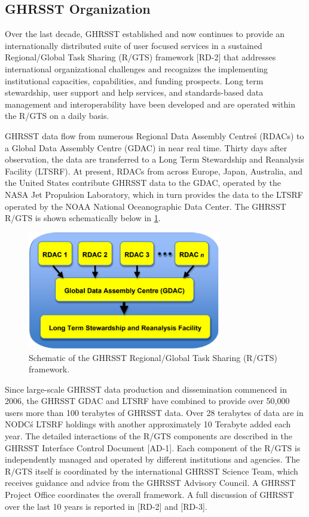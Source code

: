 \subsection{GHRSST Organization}
Over the last decade, GHRSST established and now continues to provide an internationally distributed suite of user focused services in a sustained Regional/Global Task Sharing (R/GTS) framework [RD-2] that addresses international organizational challenges and recognizes the implementing institutional capacities, capabilities, and funding prospects. Long term stewardship, user support and help services, and standards-based data management and interoperability have been developed and are operated within the R/GTS on a daily basis.
\par\vspace{0.25cm}
GHRSST data flow from numerous Regional Data Assembly Centre\'s (RDACs) to a Global Data Assembly Centre (GDAC) in near real time. Thirty days after observation, the data are transferred to a Long Term Stewardship and Reanalysis Facility (LTSRF). At present, RDACs from across Europe, Japan, Australia, and the United States contribute GHRSST data to the GDAC, operated by the NASA Jet Propulsion Laboratory, which in turn provides the data to the LTSRF operated by the NOAA National Oceanographic Data Center. The GHRSST R/GTS is shown schematically below in \ref{fig:r/gts}.
\begin{figure}[h]
    \centering
    \includegraphics[width=0.75\textwidth]{../images/schematicTaskSharing.drawio.png}
    \caption{Schematic of the GHRSST Regional/Global Task Sharing (R/GTS) framework.}
    \label{fig:r/gts}
\end{figure}
\par\vspace{0.25cm}
Since large-scale GHRSST data production and dissemination commenced in 2006, the GHRSST GDAC and LTSRF have combined to provide over 50,000 users more than 100 terabytes of GHRSST data. Over 28 terabytes of data are in NODC\'s LTSRF holdings with another approximately 10 Terabyte added each year. The detailed interactions of the R/GTS components are described in the GHRSST Interface Control Document [AD-1].
Each component of the R/GTS is independently managed and operated by different institutions and agencies. The R/GTS itself is coordinated by the international GHRSST Science Team, which receives guidance and advice from the GHRSST Advisory Council. A GHRSST Project Office coordinates the overall framework. A full discussion of GHRSST over the last 10 years is reported in [RD-2] and [RD-3].
